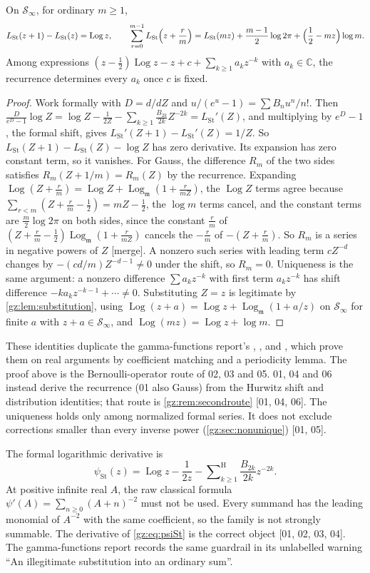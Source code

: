 \documentclass[11pt,a4paper]{article}
\numberwithin{equation}{section}
\theoremstyle{definition}
\theoremstyle{remark}
\newcommand{\C}{\mathbb C}
\newcommand{\mm}{\mathfrak m}
\newcommand{\Log}{\operatorname{Log}}
\newcommand{\Lgm}{\operatorname{Log}_{\mm}}
\newcommand{\Sh}{\mathop{\textstyle\sum}\nolimits^{\mathrm H}}
\newcommand{\LSt}{L_{\mathrm{St}}}
\newcommand{\psiSt}{\psi_{\mathrm{St}}}
\newcommand{\Sinf}{\mathcal S_{\infty}}
\newcommand{\src}[1]{\textup{[#1]}}
\newcommand{\merge}{\textup{[merge]}}
\begin{document}
\begin{proposition}[Recurrence, Gauss and formal uniqueness \src{01, 02, 03, 05, 06}]\label{gz:thm:stirling}
On $\Sinf$, for ordinary $m\ge1$,
\[
\LSt(z+1)-\LSt(z)=\Log z,\qquad
\sum_{r=0}^{m-1}\LSt\Bigl(z+\frac rm\Bigr)=\LSt(mz)+\frac{m-1}2\log2\pi+\Bigl(\frac12-mz\Bigr)\log m .
\]
Among expressions $(z-\tfrac12)\Log z-z+c+\sum_{k\ge1}a_kz^{-k}$ with
$a_k\in\C$, the recurrence determines every $a_k$ once $c$ is fixed.
\end{proposition}
\begin{proof}
Work formally with $D=d/dZ$ and $u/(e^u-1)=\sum B_nu^n/n!$. Then
$\frac D{e^D-1}\log Z=\log Z-\frac1{2Z}-\sum_{k\ge1}\frac{B_{2k}}{2k}Z^{-2k}=\LSt'(Z)$,
and multiplying by $e^D-1$, the formal shift, gives
$\LSt'(Z+1)-\LSt'(Z)=1/Z$. So $\LSt(Z+1)-\LSt(Z)-\log Z$ has zero derivative.
Its expansion has zero constant term, so it vanishes. For Gauss, the
difference $R_m$ of the two sides satisfies $R_m(Z+1/m)=R_m(Z)$ by the
recurrence. Expanding $\Log(Z+\frac rm)=\Log Z+\Lgm(1+\frac r{mZ})$, the
$\Log Z$ terms agree because $\sum_{r<m}(Z+\frac rm-\frac12)=mZ-\frac12$,
the $\log m$ terms cancel, and the constant terms are $\frac m2\log2\pi$ on
both sides, since the constant $\frac rm$ of
$(Z+\frac rm-\frac12)\Lgm(1+\frac r{mZ})$ cancels the $-\frac rm$ of
$-(Z+\frac rm)$. So $R_m$ is a series in negative powers of $Z$
\merge. A nonzero such series
with leading term $cZ^{-d}$ changes by $-(cd/m)Z^{-d-1}\ne0$ under the shift,
so $R_m=0$. Uniqueness is the same argument: a nonzero difference
$\sum a_kz^{-k}$ with first term $a_kz^{-k}$ has shift difference
$-ka_kz^{-k-1}+\cdots\ne0$. Substituting $Z=z$ is legitimate by
\cref{gz:lem:substitution}, using $\Log(z+a)=\Log z+\Lgm(1+a/z)$ on $\Sinf$
for finite $a$ with $z+a\in\Sinf$, and $\Log(mz)=\Log z+\log m$.
\end{proof}
These identities duplicate the gamma-functions report's ,
,  and , which
prove them on real arguments by coefficient matching and a periodicity
lemma. The proof above is the Bernoulli-operator route of 02, 03 and 05.
01, 04 and 06 instead derive the recurrence (01 also Gauss) from the
Hurwitz shift and distribution identities; that route is
\cref{gz:rem:secondroute} \src{01, 04, 06}. The uniqueness holds only among normalized formal series.
It does not exclude corrections smaller than every inverse power
(\cref{gz:sec:nonunique}) \src{01, 05}.

The formal logarithmic derivative is
\begin{equation}\label{gz:eq:psiSt}
\psiSt(z)=\Log z-\frac1{2z}-\Sh_{k\ge1}\frac{B_{2k}}{2k}z^{-2k}.
\end{equation}
At positive infinite real $A$, the raw classical formula
$\psi'(A)=\sum_{n\ge0}(A+n)^{-2}$ must not be used. Every summand has the
leading monomial of $A^{-2}$ with the same coefficient, so the family is not
strongly summable. The derivative of \eqref{gz:eq:psiSt} is the correct
object \src{01, 02, 03, 04}. The gamma-functions report records the same
guardrail in its unlabelled warning ``An illegitimate substitution into an
ordinary sum''.
\end{document}
